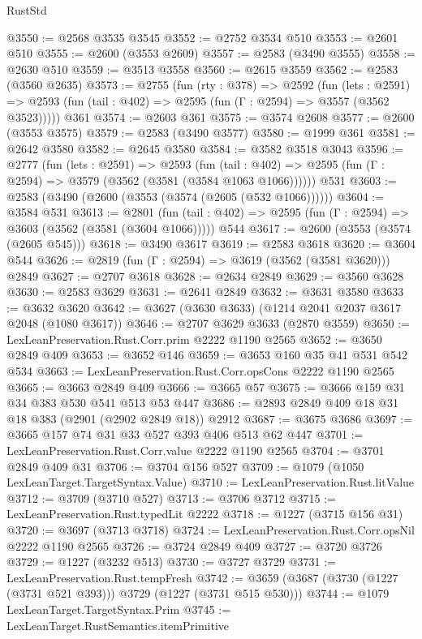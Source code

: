 \begin{lexlean}{RustStd}
\begin{coremodule}
@3550 := @2568 @3535 @3545
@3552 := @2752 @3534 @510
@3553 := @2601 @510
@3555 := @2600 (@3553 @2609)
@3557 := @2583 (@3490 @3555)
@3558 := @2630 @510
@3559 := @3513 @3558
@3560 := @2615 @3559
@3562 := @2583 (@3560 @2635)
@3573 := @2755
    (fun (rty : @378) =>
    @2592
      (fun (lets : @2591) =>
      @2593 (fun (tail : @402) => @2595 (fun (Γ : @2594) => @3557 (@3562 @3523)))))
    @361
@3574 := @2603 @361
@3575 := @3574 @2608
@3577 := @2600 (@3553 @3575)
@3579 := @2583 (@3490 @3577)
@3580 := @1999 @361
@3581 := @2642 @3580
@3582 := @2645 @3580
@3584 := @3582 @3518 @3043
@3596 := @2777
    (fun (lets : @2591) =>
    @2593
      (fun (tail : @402) => @2595 (fun (Γ : @2594) => @3579 (@3562 (@3581 (@3584 @1063 @1066))))))
    @531
@3603 := @2583 (@3490 (@2600 (@3553 (@3574 (@2605 (@532 @1066))))))
@3604 := @3584 @531
@3613 := @2801
    (fun (tail : @402) => @2595 (fun (Γ : @2594) => @3603 (@3562 (@3581 (@3604 @1066)))))
    @544
@3617 := @2600 (@3553 (@3574 (@2605 @545)))
@3618 := @3490 @3617
@3619 := @2583 @3618
@3620 := @3604 @544
@3626 := @2819 (fun (Γ : @2594) => @3619 (@3562 (@3581 @3620))) @2849
@3627 := @2707 @3618
@3628 := @2634 @2849
@3629 := @3560 @3628
@3630 := @2583 @3629
@3631 := @2641 @2849
@3632 := @3631 @3580
@3633 := @3632 @3620
@3642 := @3627 (@3630 @3633) (@1214 @2041 @2037 @3617 @2048 (@1080 @3617))
@3646 := @2707 @3629 @3633 (@2870 @3559)
@3650 := LexLeanPreservation.Rust.Corr.prim @2222 @1190 @2565
@3652 := @3650 @2849 @409
@3653 := @3652 @146
@3659 := @3653 @160 @35 @41 @531 @542 @534
@3663 := LexLeanPreservation.Rust.Corr.opsCons @2222 @1190 @2565
@3665 := @3663 @2849 @409
@3666 := @3665 @57
@3675 := @3666 @159 @31 @34 @383 @530 @541 @513 @53 @447
@3686 := @2893 @2849 @409 @18 @31 @18 @383 (@2901 (@2902 @2849 @18)) @2912
@3687 := @3675 @3686
@3697 := @3665 @157 @74 @31 @33 @527 @393 @406 @513 @62 @447
@3701 := LexLeanPreservation.Rust.Corr.value @2222 @1190 @2565
@3704 := @3701 @2849 @409 @31
@3706 := @3704 @156 @527
@3709 := @1079 (@1050 LexLeanTarget.TargetSyntax.Value)
@3710 := LexLeanPreservation.Rust.litValue
@3712 := @3709 (@3710 @527)
@3713 := @3706 @3712
@3715 := LexLeanPreservation.Rust.typedLit @2222
@3718 := @1227 (@3715 @156 @31)
@3720 := @3697 (@3713 @3718)
@3724 := LexLeanPreservation.Rust.Corr.opsNil @2222 @1190 @2565
@3726 := @3724 @2849 @409
@3727 := @3720 @3726
@3729 := @1227 (@3232 @513)
@3730 := @3727 @3729
@3731 := LexLeanPreservation.Rust.tempFresh
@3742 := @3659 (@3687 (@3730 (@1227 (@3731 @521 @393))) @3729 (@1227 (@3731 @515 @530)))
@3744 := @1079 LexLeanTarget.TargetSyntax.Prim
@3745 := LexLeanTarget.RustSemantics.itemPrimitive

\end{coremodule}
\end{lexlean}
